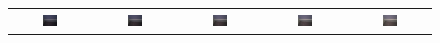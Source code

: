 \begin{figure}[H]
\begin{tabular}{ccccc}
\includegraphics[width = 0.2\textwidth]{Chapters/Images/Seq_ill/2}&
\includegraphics[width = 0.2\textwidth]{Chapters/Images/Seq_ill/3}&
\includegraphics[width = 0.2\textwidth]{Chapters/Images/Seq_ill/4}&
\includegraphics[width = 0.2\textwidth]{Chapters/Images/Seq_ill/5}&
\includegraphics[width = 0.2\textwidth]{Chapters/Images/Seq_ill/6}\\


\end{tabular}
\end{figure}
